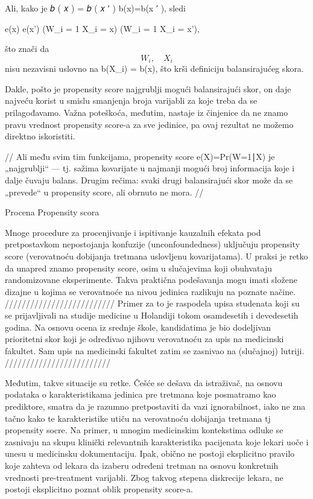 \documentclass[12pt, a4paper]{article}
\begin{document}
Ali, kako je 
𝑏
(
𝑥
)
=
𝑏
(
𝑥
′
)
b(x)=b(x
′
), sledi

e(x) \neq e(x') \;\;\Rightarrow\;\; 
\Pr(W_i = 1 \mid X_i = x) \neq \Pr(W_i = 1 \mid X_i = x'),


što znači da \[
W_i, \quad X_i
\]
 nisu nezavisni uslovno na b(X_i) = b(x), što krši definiciju balansirajućeg skora.

Dakle, pošto je propensity score najgrublji mogući balansirajući skor, on daje najveću korist u smislu smanjenja broja varijabli za koje treba da se prilagođavamo. Važna poteškoća, međutim, nastaje iz činjenice da ne znamo pravu vrednost propensity score-a za sve jedinice, pa ovaj rezultat ne možemo direktno iskoristiti.

//
Ali među svim tim funkcijama, propensity score 
e(X)=Pr(W=1∣X) je „najgrublji“ — tj. sažima kovarijate u najmanji mogući broj informacija koje i dalje čuvaju balans.
Drugim rečima: svaki drugi balansirajući skor može da se „prevede“ u propensity score, ali obrnuto ne mora.
//


Procena Propensity scora

Mnoge procedure za procenjivanje i ispitivanje kauzalnih efekata pod pretpostavkom nepostojanja konfuzije (unconfoundedness) uključuju propensity score (verovatnoću dobijanja tretmana uslovljenu kovarijatama). U praksi je retko da unapred znamo propensity score, osim u slučajevima koji obuhvataju randomizovane eksperimente. Takva praktična podešavanja mogu imati složene dizajne u kojima se verovatnoće na nivou jedinica razlikuju na poznate načine.
//////////////////////////
Primer za to je raspodela upisa studenata koji su se prijavljivali na studije medicine u Holandiji tokom osamdesetih i devedesetih godina. Na osnovu ocena iz srednje škole, kandidatima je bio dodeljivan prioritetni skor koji je određivao njihovu verovatnoću za upis na medicinski fakultet. Sam upis na medicinski fakultet zatim se zasnivao na (slučajnoj) lutriji.
/////////////////////////

Međutim, takve situacije su retke. Češće se dešava da istraživač, na osnovu podataka o karakteristikama jedinica pre tretmana koje posmatramo kao prediktore, smatra da je razumno pretpostaviti da vazi ignorabilnost, iako ne zna tačno kako te karakteristike utiču na verovatnoću dobijanja tretmana tj propensity socre.
Na primer, u mnogim medicinskim kontekstima odluke se zasnivaju na skupu klinički relevantnih karakteristika pacijenata koje lekari uoče i unesu u medicinsku dokumentaciju. Ipak, obično ne postoji eksplicitno pravilo koje zahteva od lekara da izaberu određeni tretman na osnovu konkretnih vrednosti pre-treatment varijabli. Zbog takvog stepena diskrecije lekara, ne postoji eksplicitno poznat oblik propensity score-a.
\end{document}

